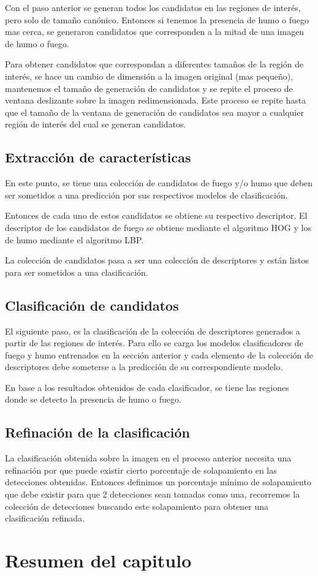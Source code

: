 \noindent Con el paso anterior se generan todos los candidatos en las regiones de interés, pero solo de tamaño canónico. Entonces si tenemos la presencia de humo o fuego mas cerca, se generaron candidatos que corresponden a la mitad de una imagen de humo o fuego.

\noindent Para obtener candidatos que correspondan a diferentes tamaños de la región de interés, se hace un cambio de dimensión a la imagen original (mas pequeño), mantenemos el tamaño de generación de candidatos y se repite el proceso de ventana deslizante sobre la imagen redimensionada. Este proceso se repite hasta que el tamaño de la ventana de generación de candidatos sea mayor a cualquier región de interés del cual se generan candidatos.

\subsection{Extracción de características}

\noindent En este punto, se tiene una colección de candidatos de fuego y/o humo que deben ser sometidos a una predicción por sus respectivos modelos de clasificación.

\noindent Entonces de cada uno de estos candidatos se obtiene su respectivo descriptor. El descriptor de los candidatos de fuego se obtiene mediante el algoritmo HOG y los de humo mediante el algoritmo LBP.

\noindent La colección de candidatos pasa a ser una colección de descriptores y están listos para ser sometidos a una clasificación.

\subsection{Clasificación de candidatos}

\noindent El siguiente paso, es la clasificación de la colección de descriptores generados a partir de las regiones de interés. Para ello se carga los modelos clasificadores de fuego y humo entrenados en la sección anterior y cada elemento de la colección de descriptores debe someterse a la predicción de su correspondiente modelo.

\noindent En base a los resultados obtenidos de cada clasificador, se tiene las regiones donde se detecto la presencia de humo o fuego.

\subsection{Refinación de la clasificación}

\noindent La clasificación obtenida sobre la imagen en el proceso anterior necesita una refinación por que puede existir cierto porcentaje de solapamiento en las detecciones obtenidas. Entonces definimos un porcentaje mínimo de solapamiento que debe existir para que 2 detecciones sean tomadas como una, recorremos la colección de detecciones buscando este solapamiento para obtener una clasificación refinada.

\section{Resumen del capitulo}
